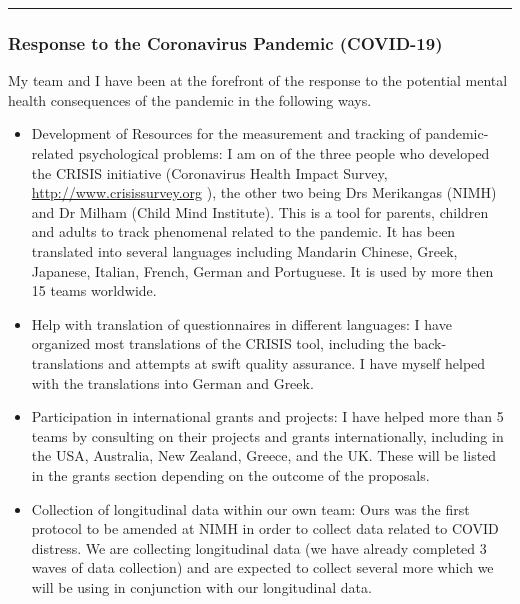 \documentclass[
]{article}
\begin{document}
\begin{center}\rule{0.5\linewidth}{0.5pt}\end{center}

\hypertarget{response-to-the-coronavirus-pandemic-covid-19}{%
\subsubsection{Response to the Coronavirus Pandemic
(COVID-19)}\label{response-to-the-coronavirus-pandemic-covid-19}}

My team and I have been at the forefront of the response to the
potential mental health consequences of the pandemic in the following
ways.

\begin{itemize}
\item
  Development of Resources for the measurement and tracking of
  pandemic-related psychological problems: I am on of the three people
  who developed the CRISIS initiative (Coronavirus Health Impact Survey,
  \url{http://www.crisissurvey.org} ), the other two being Drs
  Merikangas (NIMH) and Dr Milham (Child Mind Institute). This is a tool
  for parents, children and adults to track phenomenal related to the
  pandemic. It has been translated into several languages including
  Mandarin Chinese, Greek, Japanese, Italian, French, German and
  Portuguese. It is used by more then 15 teams worldwide.
\item
  Help with translation of questionnaires in different languages: I have
  organized most translations of the CRISIS tool, including the
  back-translations and attempts at swift quality assurance. I have
  myself helped with the translations into German and Greek.
\item
  Participation in international grants and projects: I have helped more
  than 5 teams by consulting on their projects and grants
  internationally, including in the USA, Australia, New Zealand, Greece,
  and the UK. These will be listed in the grants section depending on
  the outcome of the proposals.
\item
  Collection of longitudinal data within our own team: Ours was the
  first protocol to be amended at NIMH in order to collect data related
  to COVID distress. We are collecting longitudinal data (we have
  already completed 3 waves of data collection) and are expected to
  collect several more which we will be using in conjunction with our
  longitudinal data.
\end{itemize}
\end{document}
